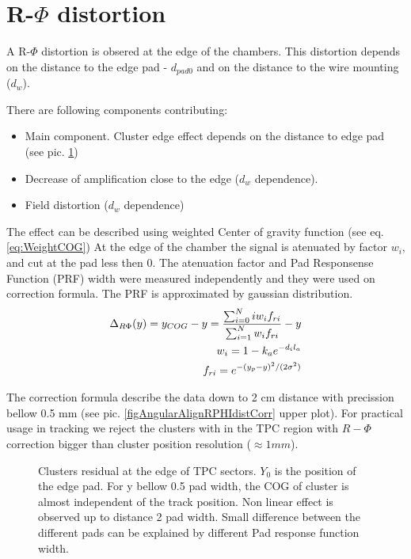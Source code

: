 \documentclass{elsart}
\begin{document}
\section{R-$\Phi$ distortion}

A R-$\Phi$ distortion is obsered at the edge of the chambers. This distortion depends on the distance to the edge pad - $d_{pad0}$ and on the distance to the wire mounting ($d_{w}$).

There are following components contributing:
\begin{itemize}
\item Main component. Cluster edge effect depends on the distance to edge pad (see pic. \ref{figAngularAlignRPHIdist})
\item Decrease of amplification close to the edge ($d_{w}$ dependence).
\item Field distortion ($d_{w}$ dependence)
\end{itemize}  

The effect can be described using weighted Center of gravity function (see eq.\ref{eq:WeightCOG})
At the edge of the chamber the signal is atenuated by factor $w_i$, and cut at the pad
less then 0. The atenuation factor and Pad Responsense Function (PRF) width were measured independently and they were used on correction formula. The PRF is approximated by gaussian 
distribution. 
\begin{eqnarray}
    \Delta_{R\Phi}(y)=y_{\rm{COG}}-y=\frac{\sum_{i=0}^{N}{iw_if_{ri}}}{\sum_{i=1}^N{w_if_{ri}}}-y \\
    w_i = 1-k_ae^{-d_il_a} \\
    f_{ri}=e^{-(y_p-y)^2/(2\sigma^2)} 	
\label{eq:WeightCOG}
\end{eqnarray}

The correction formula describe the data down to 2 cm distance with precission bellow 0.5 mm
(see pic. \ref{figAngularAlignRPHIdistCorr} upper plot). For practical usage in tracking we reject the clusters with in the TPC region with $R-\Phi$ correction bigger than cluster position resolution  ($\approx 1 mm$).

\begin{figure}
  \centering{}
  \centering{}
  \caption{Clusters residual  at the edge of TPC sectors. $Y_0$ is the position of the edge pad.
	   For y bellow 0.5 pad width, the COG of cluster is almost independent of the track position. Non linear effect is observed up to distance 2 pad width. Small difference between the different pads can be explained by different Pad response function width.
	  }
  \label{figAngularAlignRPHIdist}
\end{figure}
\end{document}
